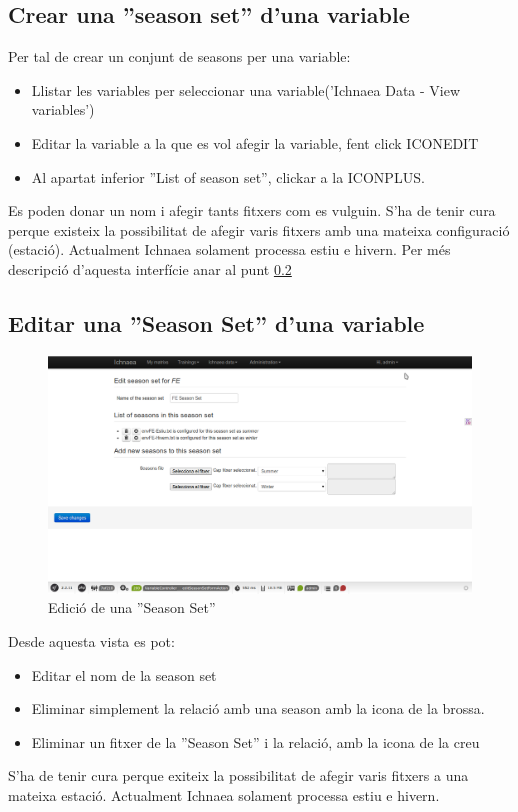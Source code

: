 \subsection{Crear una ''season set'' d'una variable}
\label{season_set:variable}
Per tal de crear un conjunt de seasons per una variable:
\begin{itemize}
\item Llistar les variables per seleccionar una variable('Ichnaea Data - View variables')
\item Editar la variable a la que es vol afegir la variable, fent click ICONEDIT
\item Al apartat inferior ''List of season set'', clickar a la ICONPLUS.
\end{itemize}
Es poden donar un nom i afegir tants fitxers com es vulguin. S'ha de tenir cura perque existeix la possibilitat de afegir varis fitxers amb una mateixa configuraci\'{o} (estaci\'{o}). Actualment Ichnaea solament processa estiu e hivern. Per m\'{e}s descripci\'{o} d'aquesta interf\'{i}cie anar al punt \ref{season_set:edit}

\subsection{Editar una ''Season Set'' d'una variable}
\label{season_set:edit}
\begin{figure}[h!]
  \centering
  \includegraphics[scale=0.2]{img/userguide/season_set_edition.png}
  \caption{Edici\'{o} de una ''Season Set''}
  \label{fig:placement}
\end{figure}
Desde aquesta vista es pot:
\begin{itemize}
	\item Editar el nom de la season set
	\item Eliminar simplement la relaci\'{o} amb una season amb la icona de la brossa.	
	\item Eliminar un fitxer de la ''Season Set'' i la relaci\'{o}, amb la icona de la creu	
\end{itemize}
S'ha de tenir cura perque exiteix la possibilitat de afegir varis fitxers a una mateixa estaci\'{o}. Actualment Ichnaea solament processa estiu e hivern.

